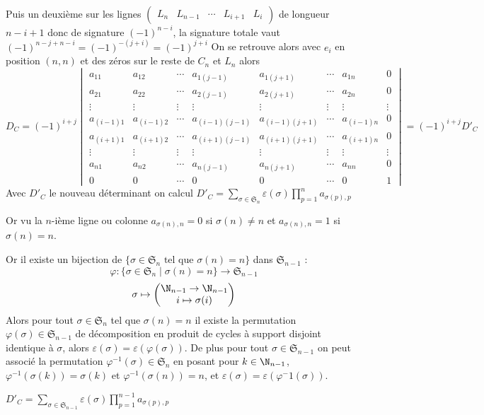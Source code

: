 \begin{prop}
Puis un deuxième sur les lignes $\begin{pmatrix}
L_n & L_{n-1} & \cdots & L_{i+1} & L_i
\end{pmatrix}$ de longueur $n-i+1$ donc de signature $(-1)^{n-i}$, la signature totale vaut $(-1)^{n-j+n-i}=(-1)^{-(j+i)}=(-1)^{j+i}$
On se retrouve alors avec $e_i$ en position $(n,n)$ et des zéros sur le reste de $C_n$ et $L_n$ alors 
$$D_C=(-1)^{i+j}\begin{vmatrix}
    a_{11} & a_{12} & \cdots &a_{1(j-1)}&a_{1(j+1)}& \cdots & a_{1n} & 0 \\
a_{21} & a_{22} & \cdots & a_{2(j-1)} &a_{2(j+1)}& \cdots & a_{2n}&0 \\
\vdots & \vdots & \vdots & \vdots & \vdots & \vdots & \vdots & \vdots  \\
a_{(i-1)1} & a_{(i-1)2} & \cdots & a_{(i-1)(j-1)} &a_{(i-1)(j+1)}& \cdots & a_{(i-1)n} & 0 \\
a_{(i+1)1} & a_{(i+1)2} & \cdots & a_{(i+1)(j-1)} &a_{(i+1)(j+1)}& \cdots & a_{(i+1)n} & 0\\
\vdots & \vdots & \vdots & \vdots & \vdots & \vdots & \vdots & \vdots  \\
a_{n1} & a_{n2} & \cdots &a_{n(j-1)} &a_{n(j+1)}& \cdots & a_{nn} & 0 \\
0&0&\cdots&0&0&\cdots&0&1
\end{vmatrix}=(-1)^{i+j}D'_C$$
Avec $D'_C$ le nouveau déterminant on calcul $\displaystyle D'_C=\sum_{\sigma\in\mathfrak{S}_n}\varepsilon(\sigma)\prod_{p=1}^n a_{\sigma(p),p}$

Or vu la $n$-ième ligne ou colonne $a_{\sigma(n),n}=0$ si $\sigma(n)\neq n$ et $a_{\sigma(n),n}=1$ si $\sigma(n)= n$.

Or il existe un bijection de $\{\sigma\in\mathfrak{S}_n \text { tel que } \sigma(n)=n\}$ dans $\mathfrak{S}_{n-1}$ : $$ \varphi : \{\sigma\in\mathfrak{S}_n \mid \sigma(n)=n\}\to \mathfrak{S}_{n-1}$$
$$\sigma\mapsto \begin{pmatrix}
\N_{n-1}\to\N_{n-1}\\
i\mapsto \sigma(i)
\end{pmatrix}$$
Alors pour tout $\sigma\in \mathfrak{S}_n$ tel que $\sigma(n)=n$ il existe la permutation $\varphi(\sigma)\in\mathfrak{S}_{n-1}$ de décomposition en produit de cycles à support disjoint identique à $\sigma$, alors $\varepsilon(\sigma)=\varepsilon(\varphi(\sigma))$. De plus pour tout $\sigma\in\mathfrak{S}_{n-1}$ on peut associé la permutation $\varphi^{-1}(\sigma)\in\mathfrak{S}_n$ en posant pour $k\in\N_{n-1}$, $\varphi^{-1}(\sigma(k))=\sigma(k)$ et $\varphi^{-1}(\sigma(n))=n$, et $\varepsilon(\sigma)=\varepsilon(\varphi^-1(\sigma))$.

$\displaystyle D'_C=\sum_{\sigma\in\mathfrak{S}_{n-1}}\varepsilon(\sigma)\prod_{p=1}^{n-1} a_{\sigma(p),p}$
\end{prop}
